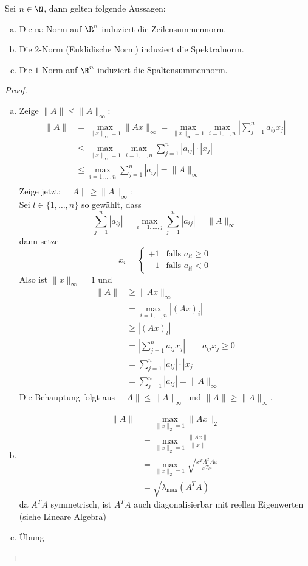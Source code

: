 \documentclass[a4paper]{scrartcl}
\numberwithin{equation}{section}
\begin{document}
\begin{lem}
\label{lem:2.13}
Sei $n\in\N$, dann gelten folgende Aussagen:
\begin{enumerate}[(a)]
\item Die $\infty$-Norm auf $\R^n$ induziert die Zeilensummennorm.
\item Die $2$-Norm (Euklidische Norm) induziert die Spektralnorm.
\item Die $1$-Norm auf $\R^n$ induziert die Spaltensummennorm.
\end{enumerate}
\begin{proof}
	\begin{enumerate}[(a)]
\item
Zeige $\|A\|\le \|A\|_\infty$:
\begin{align*}
\|A\| &= \max_{\|x\|_\infty=1}\|Ax\|_\infty 
= \max_{\|x\|_\infty=1}\max_{i=1,\dotsc,n}\left|\sum_{j=1}^na_{ij}x_j\right| \\
&\le  \max_{\|x\|_\infty=1}\max_{i=1,\dotsc,n}\sum_{j=1}^n|a_{ij}|\cdot|x_j|\\
&\le \max_{i=1,\dotsc,n}\sum_{j=1}^n|a_{ij}|
= \|A\|_\infty\\
\end{align*}
Zeige jetzt: $\|A\|\ge \|A\|_\infty$:\\
Sei $l\in\{1,\dots,n\}$ so gewählt, dass
\[
\sum_{j=1}^n|a_{lj}|=\max_{i=1,\dotsc,j}\sum_{j=1}^n|a_{ij}|=\|A\|_\infty
\]
dann setze
\[
x_i = \begin{cases}
+1 & \text{falls }a_{li} \ge 0\\
-1 & \text{falls }a_{li} < 0
\end{cases}
\]
Also ist $\|x\|_\infty = 1$ und
\begin{align*}
\|A\| &\ge \|Ax\|_\infty \\
&= \max_{i=1,\dotsc,n}|(Ax)_i| \\
&\ge |(Ax)_l| \\
&= \left|\sum_{j=1}^na_{lj}x_j\right| \qquad a_{lj}x_j\ge 0\\
&= \sum_{j=1}^n|a_{lj}|\cdot|x_j|\\
&=\sum_{j=1}^n|a_{lj}|=\|A\|_\infty
\end{align*}
Die Behauptung folgt aus $\|A\|\le \|A\|_\infty$ und $\|A\| \ge \|A\|_\infty$.

\item
\begin{align*}
\|A\|&=\max_{\|x\|_2=1}\|Ax\|_2 \\
&= \max_{\|x\|_2=1}\frac{\|Ax\|}{\|x\|}\\
&= \max_{\|x\|_2=1}\sqrt{\frac {x^TA^TAx}{x^Tx}}\\
&=\sqrt{\lambda_{\text{max}}(A^TA)}
\end{align*}
da $A^TA$ symmetrisch, ist $A^TA$ auch diagonalisierbar mit reellen Eigenwerten (siehe Lineare Algebra)

\item
Übung
\end{enumerate}
\end{proof}
\end{lem}
\end{document}
